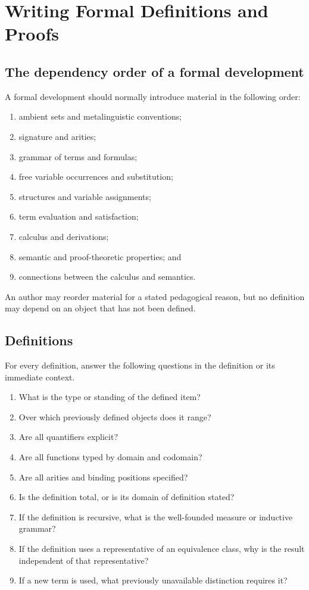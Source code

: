 \chapter{Writing Formal Definitions and Proofs}
\label{ch:writing-foundations}

\section{The dependency order of a formal development}
\label{sec:writing-foundations-01}

A formal development should normally introduce material in the following
order:
\begin{enumerate}
  \item ambient sets and metalinguistic conventions;
  \item signature and arities;
  \item grammar of terms and formulas;
  \item free variable occurrences and substitution;
  \item structures and variable assignments;
  \item term evaluation and satisfaction;
  \item calculus and derivations;
  \item semantic and proof-theoretic properties; and
  \item connections between the calculus and semantics.
\end{enumerate}
An author may reorder material for a stated pedagogical reason, but no
definition may depend on an object that has not been defined.

\section{Definitions}
\label{sec:writing-foundations-02}

\begin{method}
For every definition, answer the following questions in the definition or its
immediate context.
\begin{enumerate}
  \item What is the type or standing of the defined item?
  \item Over which previously defined objects does it range?
  \item Are all quantifiers explicit?
  \item Are all functions typed by domain and codomain?
  \item Are all arities and binding positions specified?
  \item Is the definition total, or is its domain of definition stated?
  \item If the definition is recursive, what is the well-founded measure or
        inductive grammar?
  \item If the definition uses a representative of an equivalence class, why is
        the result independent of that representative?
  \item If a new term is used, what previously unavailable distinction requires
        it?
\end{enumerate}
\end{method}

